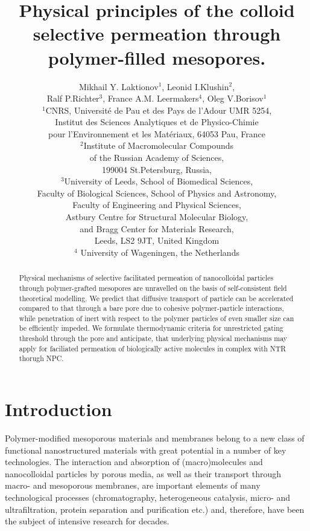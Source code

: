 \documentclass[12pt, a4paper]{article}
\title{Physical principles of the colloid selective permeation through polymer-filled mesopores.}
\author{Mikhail Y. Laktionov$^1$, Leonid I.Klushin$^{2}$,\\Ralf P.Richter$^3$, France A.M. Leermakers$^4$, Oleg V.Borisov$^1$\\
$^{1}$CNRS, Universit\'e de Pau et des Pays de l'Adour UMR 5254,\\
Institut des Sciences Analytiques et de Physico-Chimie\\
pour l'Environnement et les Mat\'eriaux, 64053 Pau, France \\
$^{2}$Institute of Macromolecular Compounds \\
of the Russian Academy of Sciences, \\
199004 St.Petersburg, Russia,\\
$^{3}$University of Leeds, School of Biomedical Sciences, \\
Faculty of Biological Sciences, 
School of Physics and Astronomy, \\
Faculty of Engineering and Physical Sciences,\\  
Astbury Centre for Structural Molecular Biology,\\ 
and Bragg Center for Materials Research,\\ 
Leeds, LS2 9JT, United Kingdom\\
$^{4}$ University of Wageningen, the Netherlands
}
\begin{document}
\maketitle

\begin{abstract}
Physical mechanisms of selective facilitated permeation of nanocolloidal particles 
through polymer-grafted mesopores are unravelled on the basis of self-consistent field theoretical modelling.
We predict that diffusive transport of particle can be accelerated compared to that through a bare pore due to
cohesive polymer-particle interactions, while penetration of inert with respect to the polymer particles of even smaller size can be 
efficiently impeded. We formulate thermodynamic criteria for unrestricted gating threshold through the pore and anticipate, that underlying
physical mechanisms may apply for faciliated permeation of biologically active molecules in complex with NTR thorugh NPC.   
\end{abstract}

\section{Introduction}

Polymer-modified mesoporous materials and membranes belong to a new class of functional nanostructured materials with great potential in a number of key technologies. 
The interaction and absorption of (macro)molecules and nanocolloidal particles by porous media, as well as their transport through macro- and mesoporous membranes, 
are important elements of many technological processes (chromatography, heterogeneous catalysis, micro- and ultrafiltration, protein separation and purification etc.) 
and, therefore, have been the subject of intensive research for decades. 
\end{document}
